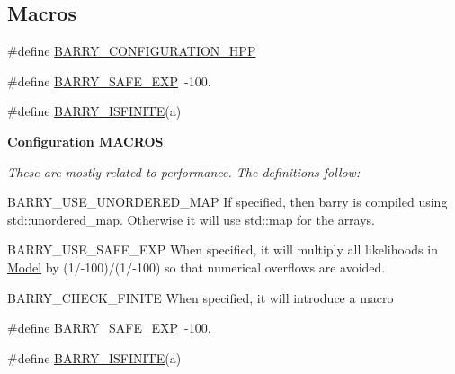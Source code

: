 \subsection*{Macros}
\begin{DoxyCompactItemize}
\item 
\#define \hyperlink{barry_8hpp_a62a616299801c1da9d3639e85fdeff04}{B\+A\+R\+R\+Y\+\_\+\+C\+O\+N\+F\+I\+G\+U\+R\+A\+T\+I\+O\+N\+\_\+\+H\+PP}
\item 
\#define \hyperlink{barry_8hpp_aa8fd3df3585111e6734d97092df83f57}{B\+A\+R\+R\+Y\+\_\+\+S\+A\+F\+E\+\_\+\+E\+XP}~-\/100.
\item 
\#define \hyperlink{barry_8hpp_aa3c8e71d6d426f5207d478054c790a13}{B\+A\+R\+R\+Y\+\_\+\+I\+S\+F\+I\+N\+I\+TE}(a)
\end{DoxyCompactItemize}
\begin{Indent}\textbf{ Configuration M\+A\+C\+R\+OS}\par
{\em These are mostly related to performance. The definitions follow\+:


\begin{DoxyItemize}
\item {\ttfamily B\+A\+R\+R\+Y\+\_\+\+U\+S\+E\+\_\+\+U\+N\+O\+R\+D\+E\+R\+E\+D\+\_\+\+M\+AP} If specified, then barry is compiled using {\ttfamily std\+::unordered\+\_\+map}. Otherwise it will use {\ttfamily std\+::map} for the arrays.
\item {\ttfamily B\+A\+R\+R\+Y\+\_\+\+U\+S\+E\+\_\+\+S\+A\+F\+E\+\_\+\+E\+XP} When specified, it will multiply all likelihoods in {\ttfamily \hyperlink{class_model}{Model}} by (1/-\/100)/(1/-\/100) so that numerical overflows are avoided.
\item {\ttfamily B\+A\+R\+R\+Y\+\_\+\+C\+H\+E\+C\+K\+\_\+\+F\+I\+N\+I\+TE} When specified, it will introduce a macro 
\end{DoxyItemize}}\begin{DoxyCompactItemize}
\item 
\#define \hyperlink{barry-configuration_8hpp_aa8fd3df3585111e6734d97092df83f57}{B\+A\+R\+R\+Y\+\_\+\+S\+A\+F\+E\+\_\+\+E\+XP}~-\/100.
\item 
\#define \hyperlink{barry-configuration_8hpp_aa3c8e71d6d426f5207d478054c790a13}{B\+A\+R\+R\+Y\+\_\+\+I\+S\+F\+I\+N\+I\+TE}(a)
\end{DoxyCompactItemize}
\end{Indent}
